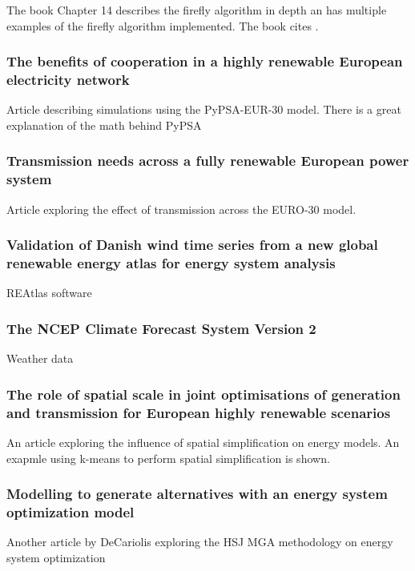 The book \cite{Bio_computation_book} Chapter 14 describes the firefly algorithm in depth an has multiple examples of the firefly algorithm implemented. The book cites \cite{FireFly_MGA_Article} . 

\subsubsection*{The benefits of cooperation in a highly renewable European electricity network \cite{PypsaModel}}
Article describing simulations using the PyPSA-EUR-30 model. There is a great explanation of the math behind PyPSA 

\subsubsection*{Transmission needs across a fully renewable European power system}
\cite{RODRIGUEZ2014467}
Article exploring the effect of transmission across the EURO-30 model. 

\subsubsection*{Validation of Danish wind time series from a new global renewable energy atlas for energy system analysis}
\cite{ANDRESEN20151074} REAtlas software

\subsubsection*{The NCEP Climate Forecast System Version 2}
\cite{ClimateForecastSystem} Weather data

\subsubsection*{The role of spatial scale in joint optimisations of generation and transmission for European highly renewable scenarios\cite{spatialInfluence} }
An article exploring the influence of spatial simplification on energy models. An exapmle using k-means to perform spatial simplification is shown.  

\subsubsection*{Modelling to generate alternatives with an energy system optimization model \cite{DECAROLIS2016}}
Another article by DeCariolis exploring the HSJ MGA methodology on energy system optimization 

